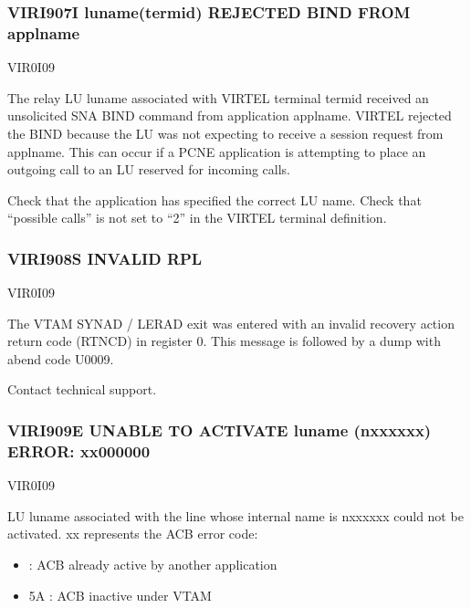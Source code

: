 \documentclass[letterpaper,10pt,english]{sphinxmanual}
\begin{document}
\subsubsection{VIRI907I luname(termid) REJECTED BIND FROM applname}
\label{\detokenize{messages:viri907i-luname-termid-rejected-bind-from-applname}}\begin{description}
\sphinxAtStartPar
VIR0I09

\sphinxAtStartPar
The relay LU luname associated with VIRTEL terminal termid received an unsolicited SNA BIND command from application applname. VIRTEL rejected the BIND because the LU was not expecting to receive a session request from applname. This can occur if a PCNE application is attempting to place an outgoing call to an LU reserved for incoming calls.

\sphinxAtStartPar
Check that the application has specified the correct LU name. Check that “possible calls” is not set to “2” in the VIRTEL terminal definition.

\end{description}


\subsubsection{VIRI908S INVALID RPL}
\label{\detokenize{messages:viri908s-invalid-rpl}}\begin{description}
\sphinxAtStartPar
VIR0I09

\sphinxAtStartPar
The VTAM SYNAD / LERAD exit was entered with an invalid recovery action return code (RTNCD) in register 0. This message is followed by a dump with abend code U0009.

\sphinxAtStartPar
Contact technical support.

\end{description}


\subsubsection{VIRI909E UNABLE TO ACTIVATE luname (n\sphinxhyphen{}xxxxxx) ERROR: xx000000}
\label{\detokenize{messages:viri909e-unable-to-activate-luname-n-xxxxxx-error-xx000000}}\begin{description}
\sphinxAtStartPar
VIR0I09

\sphinxAtStartPar
LU luname associated with the line whose internal name is n\sphinxhyphen{}xxxxxx could not be activated. xx represents the ACB error code:
\begin{itemize}
\item {} 
 : ACB already active by another application

\item {} 
\sphinxAtStartPar
5A : ACB inactive under VTAM

\end{itemize}

\end{description}
\end{document}
